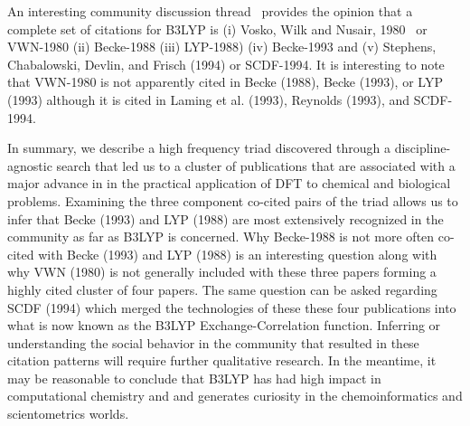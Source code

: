 \documentclass[11pt, oneside]{article}   	%
\begin{document}
An interesting community discussion thread~\citep{johansson2002} provides the opinion that a complete set of citations for B3LYP is (i) Vosko, Wilk and Nusair, 1980~\citep{vosko1980accurate} or VWN-1980 (ii) Becke-1988 (iii) LYP-1988) (iv) Becke-1993 and (v) Stephens, Chabalowski, Devlin, and Frisch (1994) or SCDF-1994. It is interesting to note that VWN-1980  is not apparently cited in Becke (1988), Becke (1993), or LYP (1993) although it is cited in Laming et al. (1993), Reynolds (1993), and SCDF-1994.

In summary, we describe a high frequency triad discovered through a discipline-agnostic search that led us to a cluster of publications that are associated with a major advance in  in the practical application of DFT to chemical and biological problems. Examining the three component co-cited pairs of the triad allows us to infer that Becke (1993) and LYP (1988) are most extensively recognized in the community as far as B3LYP is concerned. Why Becke-1988 is not more often co-cited with Becke (1993) and LYP (1988) is an interesting question along with why VWN (1980) is not generally included with these three papers forming a highly cited cluster of four papers. The same question can be asked regarding SCDF (1994) which merged the technologies of these these four publications into what is now known as the B3LYP Exchange-Correlation function.  Inferring or understanding the social behavior in the community that resulted in these citation patterns will require further qualitative research. In the meantime, it may be reasonable to conclude that B3LYP has had high impact in computational chemistry and and generates curiosity in the chemoinformatics  and scientometrics worlds.



\end{document}
